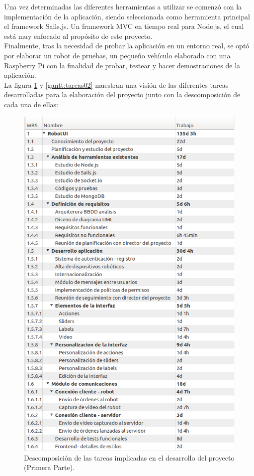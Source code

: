 \documentclass[a4paper,12pt]{article}
\begin{document}
Una vez determinadas las diferentes herramientas a utilizar se comenzó con la implementación de la aplicación, siendo seleccionada como herramienta principal el framework Sails.js. Un framework MVC en 
tiempo real para Node.js, el cual está muy enfocado al propósito de este proyecto.\\

Finalmente, tras la necesidad de probar la aplicación en un entorno real, se optó por elaborar un robot de pruebas, un pequeño vehículo elaborado con una Raspberry Pi con la finalidad de probar, testear y hacer 
demostraciones de la aplicación.\\

La figura \ref{gantt:tareas01} y \ref{gantt:tareas02} muestran una visión de las diferentes tareas desarrolladas para la elaboración del proyecto junto con la descomposición de cada una de ellas:\\

\begin{figure}[H]
  \begin{center}
    \includegraphics[scale=0.6]{imagenes/descomposicion_tareas01.png}
  \end{center}
  \caption{Descomposición de las tareas implicadas en el desarrollo del proyecto (Primera Parte).}
  \label{gantt:tareas01}
\end{figure}
\end{document}
